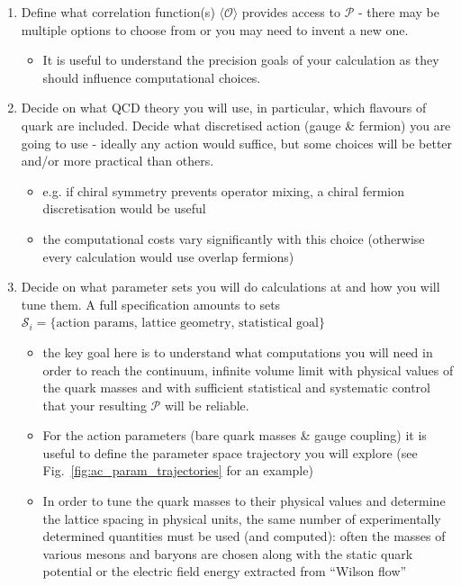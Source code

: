 \begin{enumerate}
    \item Define what correlation function(s) $\langle \mathcal{O} \rangle$ provides access to $\mathcal{P}$ - there may be multiple options to choose from or you may need to invent a new one. 
    \begin{itemize}
        \item It is useful to understand the precision goals of your calculation as they should influence computational choices.
    \end{itemize}
    \item Decide on what QCD theory you will use, in particular, which flavours of quark are included. Decide what discretised action (gauge \& fermion) you are going to use - ideally any action would suffice, but some choices will be better and/or more practical than others.
    \begin{itemize}
        \item e.g. if chiral symmetry prevents operator mixing, a chiral fermion discretisation would be useful
        \item the computational costs vary significantly with this choice (otherwise every calculation would use overlap fermions)
    \end{itemize}
    \item Decide on what parameter sets you will do calculations at and how you will tune them. A full specification amounts to sets $\mathcal{S}_i = \{\text{action params, lattice geometry, statistical goal}\}$
    \begin{itemize}
        \item the key goal here is to understand what computations you will need in order to reach the continuum, infinite volume limit with physical values of the quark masses and with sufficient statistical and systematic control that your resulting $\mathcal{P}$ will be reliable.
        \item For the action parameters (bare quark masses \& gauge coupling) it is useful to define the parameter space trajectory you will explore (see Fig.~\ref{fig:ac_param_trajectories} for an example)
        \item In order to tune the quark masses to their physical values and determine the lattice spacing in physical units, the same number of experimentally determined quantities must be used (and computed): often the masses of various mesons and baryons are chosen along with the static quark potential or the electric field energy extracted from ``Wilson flow''

\end{itemize}
\end{enumerate}
